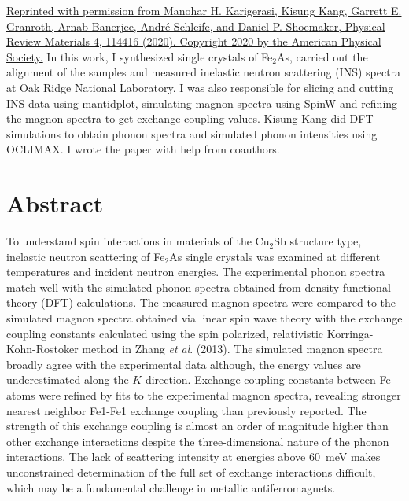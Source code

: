 \documentclass[10pt,doublespacing,edeposit]{uiucthesis2020}
\begin{document}
\begin{mainmatter}
\href{https://doi.org/10.1103/PhysRevMaterials.4.114416}{Reprinted with permission from Manohar H. Karigerasi, Kisung Kang, Garrett E. Granroth, Arnab Banerjee, Andr\'e Schleife, and Daniel P. Shoemaker, Physical Review Materials 4, 114416 (2020). Copyright 2020 by the American Physical Society.} In this work, I synthesized single crystals of Fe$_2$As, carried out the alignment of the samples and measured inelastic neutron scattering (INS) spectra at Oak Ridge National Laboratory. I was also responsible for slicing and cutting INS data using mantidplot, simulating magnon spectra using SpinW and refining the magnon spectra to get exchange coupling values. Kisung Kang did DFT simulations to obtain phonon spectra and simulated phonon intensities using OCLIMAX. I wrote the paper with help from coauthors.



\section{Abstract}
To understand spin interactions in materials of the Cu$_2$Sb structure type, inelastic neutron scattering of Fe$_2$As single crystals was examined at different temperatures and incident neutron energies. The experimental phonon spectra match well with the simulated phonon spectra obtained from density functional theory (DFT) calculations. The measured magnon spectra were compared to the simulated magnon spectra obtained via linear spin wave theory with the exchange coupling constants calculated using the spin polarized, relativistic Korringa-Kohn-Rostoker method in Zhang \emph{et al}. (2013). The simulated magnon spectra broadly agree with the experimental data although, the energy values are underestimated along the $K$ direction. Exchange coupling constants between Fe atoms were refined by fits to the experimental magnon spectra, revealing stronger nearest neighbor Fe1-Fe1 exchange coupling than previously reported. The strength of this exchange coupling is almost an order of magnitude higher than other exchange interactions despite the three-dimensional nature of the phonon interactions. The lack of scattering intensity at energies above 60~meV makes unconstrained determination of the full set of exchange interactions difficult, which may be a fundamental challenge in metallic antiferromagnets.





\end{mainmatter}
\end{document}
